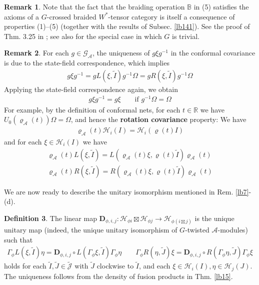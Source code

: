 \documentclass[11pt,b5paper,notitlepage]{article}
\theoremstyle{definition}
\newtheorem{df}{Definition}[section]
\newtheorem{rem}[df]{Remark}
\theoremstyle{plain}
\newcommand{\wtd}{\widetilde}
\newcommand{\GA}{\mathscr G_{\mathcal A}}
\newcommand{\Jtd}{\widetilde{\mathcal J}}
\newcommand{\mbf}{\mathbf}
\newcommand{\Rbb}{\mathbb R}
\renewcommand{\Bbb}{\mathbb B}
\newcommand{\MA}{\mathcal A}
\newcommand{\MH}{\mathcal H}
\numberwithin{equation}{section}
\begin{document}
\begin{rem}
Note that the fact that the braiding operation $\Bbb$ in (5) satisfies the axioms of a $G$-crossed braided $W^*$-tensor category is itself a consequence of properties (1)--(5) (together with the results of Subsec. \ref{lb141}). See the proof of Thm. 3.25 in \cite{MS26a}; see also \cite[Sec. 3.3]{Gui21a} for the special case in which $G$ is trivial.
\end{rem}

\begin{rem}\label{lb32}
For each $g\in\GA$, the uniqueness of $g\xi g^{-1}$ in the conformal covariance is due to the state-field correspondence, which implies
\begin{align}
g\xi g^{-1}=gL(\xi,\wtd I)g^{-1}\Omega=gR(\xi,\wtd I)g^{-1}\Omega
\end{align}
Applying the state-field correspondence again, we obtain
\begin{align*}
g\xi g^{-1}=g\xi\qquad\text{if }g^{-1}\Omega=\Omega
\end{align*}
For example, by the definition of conformal nets, for each $t\in\Rbb$ we have $U_0(\varrho_\MA(t))\Omega=\Omega$, and hence the \textbf{rotation covariance} property: We have
\begin{align}
\varrho_\MA(t)\MH_i(I)=\MH_i(\varrho(t)I)
\end{align}
and for each $\xi\in\MH_i(I)$ we have
\begin{subequations}
\begin{gather}
\varrho_\MA(t)L(\xi,\wtd I)=L(\varrho_\MA(t)\xi,\varrho(t)\wtd I)\varrho_\MA(t)\\
\varrho_\MA(t)R(\xi,\wtd I)=R(\varrho_\MA(t)\xi,\varrho(t)\wtd I)\varrho_\MA(t)
\end{gather}
\end{subequations}
\end{rem}

We are now ready to describe the unitary isomorphism  mentioned in Rem. \ref{lb7}-(d).

\begin{df}\label{lb16}
The linear map $\mbf D_{\phi,i,j}:\MH_{\phi i}\boxtimes\MH_{\phi j}\rightarrow \MH_{\phi(i\boxtimes j)}$ is the unique unitary map (indeed, the unique unitary isomorphism of $G$-twisted $\MA$-modules) such that
\begin{align}\label{eq11}
\Gamma_\phi L(\xi,\wtd I)\eta=\mbf D_{\phi,i,j}\circ L(\Gamma_\phi\xi,\wtd I)\Gamma_\phi\eta\qquad \Gamma_\phi R(\eta,\wtd J)\xi=\mbf D_{\phi,i,j}\circ R(\Gamma_\phi\eta,\wtd J)\Gamma_\phi\xi
\end{align} 
holds for each $\wtd I,\wtd J\in\Jtd$ with $\wtd J$ clockwise to $\wtd I$, and each $\xi\in\MH_i(I),\eta\in\MH_j(J)$. The uniqueness follows from the density of fusion products in Thm. \ref{lb15}.
\end{df}
\end{document}
